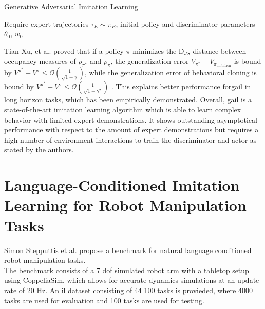 \begin{algorithm}
    \caption{Generative Adversarial Imitation Learning}
    \label{GAIL_Algo_app}
    Require expert trajectories $\tau_E \sim \pi_E$, initial policy and discriminator parameters $\theta_0$, $w_0$\\
\end{algorithm}
Tian Xu, et al. proved that if a policy $\pi$ minimizes the $\text{D}_{JS}$ distance 
between occupancy measures of $\rho_{\pi^*}$ and $\rho_{\pi}$, the generalization error $V_{\pi^*} - V_{\pi_{\text{imitation}}}$ is bound by 
$V^{{\pi^*}} - V^{\pi} \leq \mathcal{O}\left(\frac{1}{\sqrt{1-\gamma}}\right)$, while the generalization error of behavioral cloning is bound by 
$V^{{\pi^*}} - V^{\pi} \leq \mathcal{O}\left(\frac{1}{\sqrt{1-\gamma^2}}\right)$ \cite{NEURIPS2020_b5c01503} . This explains better performance for\ac{gail} in long horizon tasks, which has 
been empirically demonstrated. Overall, \ac{gail} is a state-of-the-art imitation learning algorithm which is able to learn complex behavior with limited expert demonstrations. It shows outstanding 
asymptotical performance with respect to the amount of expert demonstrations but requires a high number of environment interactions to train the discriminator and actor as stated by the authors. 

\chapter{Language-Conditioned Imitation Learning for Robot Manipulation Tasks}
\label{LCILRM}
Simon Stepputtis et al. \cite{stepputtis2020languageconditioned} propose a benchmark for natural language conditioned robot manipulation tasks. \\
The benchmark consists of a 7 dof simulated robot arm with a 
tabletop setup using CoppeliaSim, which allows for accurate dynamics simulations at an update rate of 20 Hz. 
An \ac{il} dataset consisting of 44 100 tasks is provieded, where 4000 tasks are used for 
evaluation and 100 tasks are used for testing.\\

